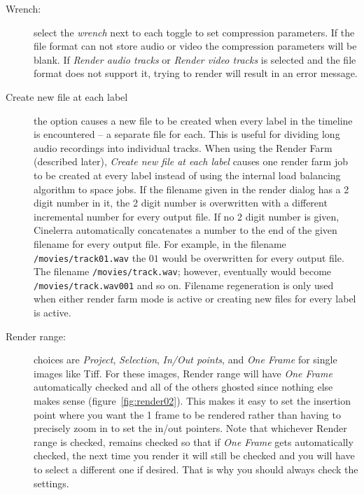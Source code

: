 \begin{description}
    \item[Wrench:] select the \textit{wrench} next to each toggle to set compression parameters.  If the file format can not store audio or video the compression parameters will be blank.  If \textit{Render audio tracks} or \textit{Render video tracks} is selected and the file format does not support it, trying to render will result in an error message.
    \item[Create new file at each label] the option causes a new file to be created when every label in the timeline is encountered – a separate file for each.  This is useful for dividing long audio recordings into individual tracks.  When using the Render Farm (described later), \textit{Create new file at each label} causes one render farm job to be created at every label instead of using the internal load balancing algorithm to space jobs.   If the filename given in the render dialog has a 2 digit number in it, the 2 digit number is overwritten with a different incremental number for every output file. If no 2 digit number is given, Cinelerra automatically concatenates a number to the end of the given filename for every output file.
    For example, in the filename \texttt{/movies/track01.wav} the $01$ would be overwritten for every output file. 
    The filename \texttt{/movies/track.wav}; however, eventually would become \texttt{/movies/track.wav001} and so on.  
    Filename regeneration is only used when either render farm mode is active or creating new files for every label is active.
    \item[Render range:] choices are \textit{Project}, \textit{Selection}, \textit{In/Out points}, and \textit{One Frame} for single images like Tiff.  For these images, Render range will have \textit{One Frame} automatically checked and all of the others ghosted since nothing else makes sense (figure~\ref{fig:render02}).  This makes it easy to set the insertion point where you want the 1 frame to be rendered rather than having to precisely zoom in to set the in/out pointers.  Note that whichever Render range is checked, remains checked so that if \textit{One Frame} gets automatically checked, the next time you render it will still be checked and you will have to select a different one if desired.  That is why you should always check the settings.
\end{description}

